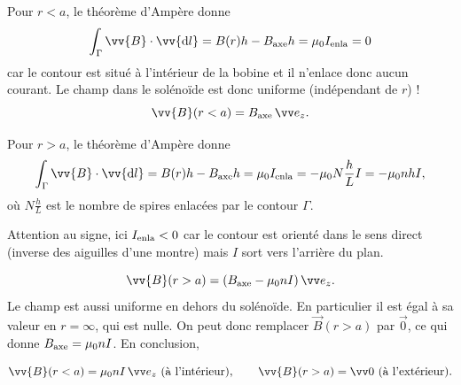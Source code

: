 \documentclass[12pt,fancy]{cours}
\begin{document}
\begin{liste}
\item Pour $r<a$, le théorème d'Ampère donne
\begin{equation}
\int_{\Gamma}\vv{B}\cdot\vv{\d l}=B(r)h-B_{\rm{axe}}h=\mu_0 I_{\rm{enla}}=0
\end{equation}
car le contour est situé à l'intérieur de la bobine et il n'enlace donc aucun courant. Le champ dans le solénoïde est donc uniforme (indépendant de $r$) !
\begin{equation}
\vv{B}(r<a)=B_{\rm{axe}}\,\ez.
\end{equation}

\item
Pour $r>a$, le théorème d'Ampère donne
\begin{equation}
\int_{\Gamma}\vv{B}\cdot\vv{\d l}=B(r)h-B_{\rm{axe}}h=\mu_0 I_{\rm{enla}}=-\mu_0 N\frac{h}{L}I = -\mu_0 nhI,
\end{equation}
où $N\frac{h}{L}$ est le nombre de spires enlacées par le contour $\Gamma$.

\begin{remarque}
Attention au signe, ici $I_{\rm{enla}}<0$ car le contour est orienté dans le sens direct (inverse des aiguilles d’une montre) mais $I$ sort vers l’arrière du plan.
\end{remarque}
\end{liste}
\begin{equation}
\vv{B}(r>a)=(B_{\rm{axe}}-\mu_0 n I)\,\ez.
\end{equation}
Le champ est aussi uniforme en dehors du solénoïde. En particulier il est égal à sa valeur en $r=\infty$, qui est nulle. On peut donc remplacer $\Vec{B}(r>a)$ par $\Vec{0}$, ce qui donne $B_{\rm axe} = \mu_0 n I$. En conclusion,
\begin{theorem}\label{form:champ_sol}
\begin{equation*}
\vv{B}(r<a)=\mu_0 n I\,\ez \text{ (à l’intérieur)}, \qquad
\vv{B}(r>a)=\Vec{0} \text{ (à l’extérieur)}.
\end{equation*}
\end{theorem}

\begin{figure}[h!]
\centering

\label{fig:}
\end{figure}
\end{document}
